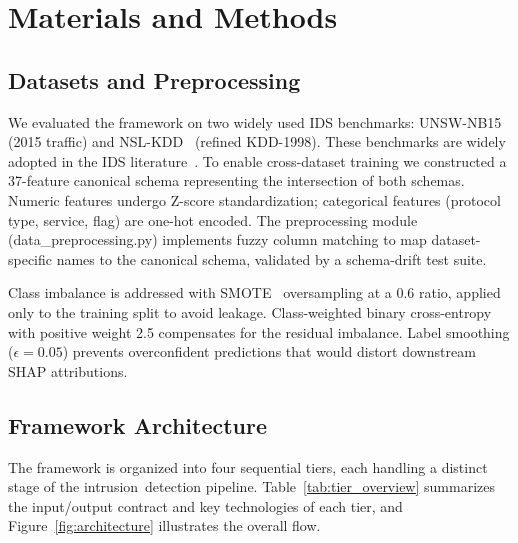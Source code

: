 \documentclass[sensors,apajournal,article,submit,moreauthors]{Definitions/mdpi}
\begin{document}
\section{Materials and Methods}

\subsection{Datasets and Preprocessing}

We evaluated the framework on two widely used IDS benchmarks: UNSW-NB15~\citep{moustafa2015unsw} (2015 traffic) and NSL-KDD~\citep{tavallaee2009detailed} (refined KDD-1998). These benchmarks are widely adopted in the IDS literature~\citep{khraisat2019survey,mahdavifar2019application}. To enable \mbox{cross-dataset} training we constructed a 37-feature canonical schema representing the intersection of both schemas. Numeric features undergo Z-score standardization; categorical features (protocol type, service, flag) are one-hot encoded. The preprocessing module (data\_preprocessing.py) implements fuzzy column matching to map dataset-specific names to the canonical schema, validated by a schema-drift test suite.

Class imbalance is addressed with SMOTE~\citep{chawla2002smote} oversampling at a 0.6 ratio, applied only to the training split to avoid leakage. Class-weighted binary cross-entropy with positive weight 2.5 compensates for the residual imbalance. Label smoothing ($\epsilon = 0.05$) prevents overconfident predictions that would distort downstream SHAP attributions.

\subsection{Framework Architecture}

The framework is organized into four sequential tiers, each handling a distinct stage of the \mbox{intrusion detection} pipeline. Table~\ref{tab:tier_overview} summarizes the input/output contract and key technologies of each tier, and Figure~\ref{fig:architecture} illustrates the overall flow.
\end{document}
